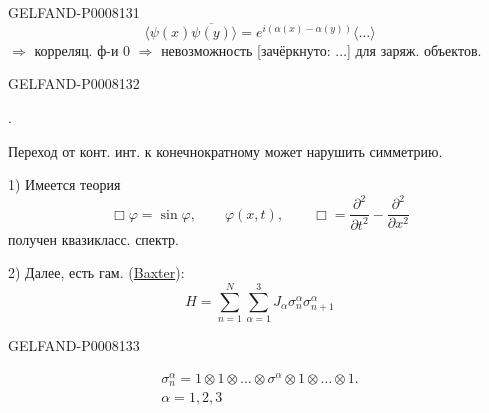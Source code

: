\begin{GelfandAdjacentEvidence}{GELFAND-P000813}{1}
\[
\langle\psi(x)\overline{\psi(y)}\rangle
=e^{i(\alpha(x)-\alpha(y))}\langle\ldots\rangle
\]
\(\Rightarrow\) корреляц. ф-и \(0\) \(\Rightarrow\) невозможность
[зачёркнуто: \(\ldots\)] для заряж. объектов.
\end{GelfandAdjacentEvidence}
\begin{GelfandAdjacentEvidence}{GELFAND-P000813}{2}


.

Переход от конт. инт. к конечнократному может нарушить симметрию.

1) Имеется теория
\[
\Box\varphi=\sin\varphi,\qquad \varphi(x,t),\qquad
\Box=\frac{\partial^2}{\partial t^2}-\frac{\partial^2}{\partial x^2}
\]
получен квазикласс. спектр.

2) Далее, есть гам. (\uline{Baxter}):
\begin{equation*}
H=\sum_{n=1}^N\sum_{\alpha=1}^3 J_\alpha\sigma_n^\alpha\sigma_{n+1}^\alpha \tag{1}
\end{equation*}

\end{GelfandAdjacentEvidence}
\begin{GelfandAdjacentEvidence}{GELFAND-P000813}{3}


\[
\begin{gathered}
\sigma_n^\alpha=1\otimes1\otimes\ldots\otimes
\sigma^\alpha\otimes1\otimes\ldots\otimes1.\\
\alpha=1,2,3
\end{gathered}
\]
\end{GelfandAdjacentEvidence}

